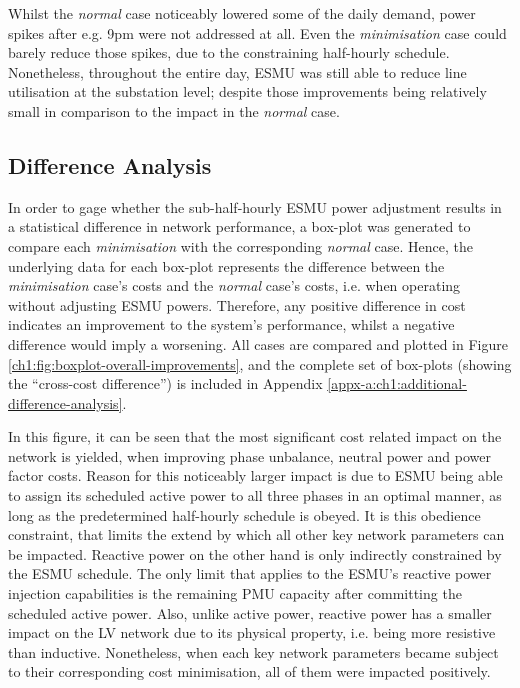 

Whilst the \textit{normal} case noticeably lowered some of the daily demand, power spikes after e.g. 9pm were not addressed at all.
Even the \textit{minimisation} case could barely reduce those spikes, due to the constraining half-hourly schedule.
Nonetheless, throughout the entire day, ESMU was still able to reduce line utilisation at the substation level; despite those improvements being relatively small in comparison to the impact in the \textit{normal} case.

\subsection{Difference Analysis}
\label{ch1:subsec:difference-analysis}

In order to gage whether the sub-half-hourly ESMU power adjustment results in a statistical difference in network performance, a box-plot was generated to compare each \textit{minimisation} with the corresponding \textit{normal} case.
Hence, the underlying data for each box-plot represents the difference between the \textit{minimisation} case's costs and the \textit{normal} case's costs, i.e. when operating without adjusting ESMU powers.
Therefore, any positive difference in cost indicates an improvement to the system's performance, whilst a negative difference would imply a worsening.
All cases are compared and plotted in Figure \ref{ch1:fig:boxplot-overall-improvements}, and the complete set of box-plots (showing the ``cross-cost difference'') is included in Appendix \ref{appx-a:ch1:additional-difference-analysis}.



In this figure, it can be seen that the most significant cost related impact on the network is yielded, when improving phase unbalance, neutral power and power factor costs.
Reason for this noticeably larger impact is due to ESMU being able to assign its scheduled active power to all three phases in an optimal manner, as long as the predetermined half-hourly schedule is obeyed.
It is this obedience constraint, that limits the extend by which all other key network parameters can be impacted.
Reactive power on the other hand is only indirectly constrained by the ESMU schedule.
The only limit that applies to the ESMU's reactive power injection capabilities is the remaining PMU capacity after committing the scheduled active power.
Also, unlike active power, reactive power has a smaller impact on the LV network due to its physical property, i.e. being more resistive than inductive.
Nonetheless, when each key network parameters became subject to their corresponding cost minimisation, all of them were impacted positively.


